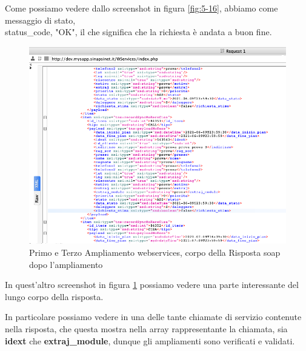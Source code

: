 \begin{flushleft}
	Come possiamo vedere dallo screenshot in figura \ref{fig:5-16}, abbiamo come messaggio di stato, \\status\_code, "OK", il che significa che la richiesta è andata a buon fine.
\end{flushleft}
\newpage
\begin{figure}[!h] 
	\centering
	\includegraphics[scale = 0.5]{immagini/webservices/ampliamenti/accettazione/3ampl__risposta_soap_singola-chiamata.png}
	\caption{Primo e Terzo Ampliamento webservices, corpo della Risposta \gls{soap} dopo l'ampliamento}
	\label{fig:5-17}
\end{figure}

\begin{flushleft}
	In quest'altro screenshot in figura \ref{fig:5-17} possiamo vedere una parte interessante del lungo corpo della risposta.
	\newspace
	
	In particolare possiamo vedere in una delle tante chiamate di servizio contenute nella risposta, che questa mostra nella array rappresentante la chiamata, sia \textbf{idext} che \textbf{extraj\_module}, dunque gli ampliamenti sono verificati e validati.
\end{flushleft}